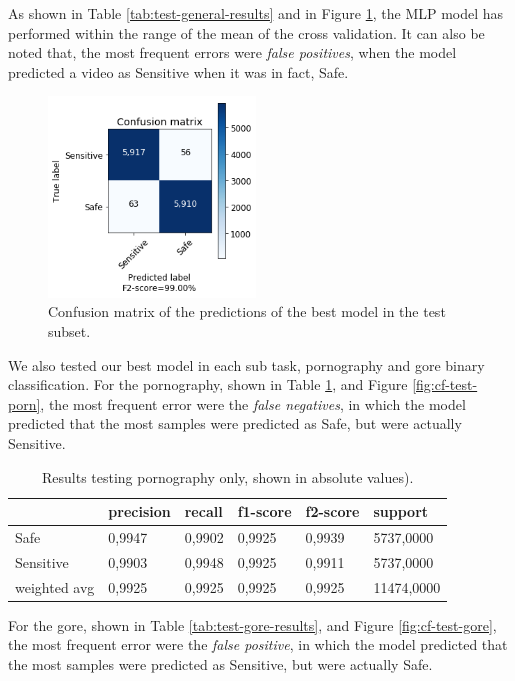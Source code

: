 As shown in Table \ref{tab:test-general-results} and in Figure \ref{fig:cf-test}, the MLP model has performed within the range of the mean of the cross validation. It can also be noted that, the most frequent errors were \textit{false positives}, when the model predicted a video as Sensitive when it was in fact, Safe. 

\begin{figure}[!ht]
    \centering
    \includegraphics[width=0.49\textwidth]{img/results/MLP-TEST.png}
    \caption{Confusion matrix of the predictions of the best model in the test subset.}
    \label{fig:cf-test}
\end{figure}

We also tested our best model in each sub task, pornography and gore binary classification. For the pornography, shown in Table \ref{tab:test-porn-results}, and Figure \ref{fig:cf-test-porn}, the most frequent error were the \textit{false negatives}, in which the model predicted that the most samples were predicted as Safe, but were actually Sensitive. 

\begin{table}[!ht]
\centering
\caption{Results testing pornography only, shown in absolute values).}
\begin{tabular}{l|l|l|l|l|l}
             & precision & recall & f1-score & f2-score & support    \\ \hline
Safe         & 0,9947    & 0,9902 & 0,9925   & 0,9939   & 5737,0000  \\ \hline
Sensitive    & 0,9903    & 0,9948 & 0,9925   & 0,9911   & 5737,0000  \\ \hline
weighted avg & 0,9925    & 0,9925 & 0,9925   & 0,9925   & 11474,0000
\end{tabular}
\label{tab:test-porn-results}
\end{table}

For the gore, shown in Table \ref{tab:test-gore-results}, and Figure \ref{fig:cf-test-gore}, the most frequent error were the \textit{false positive}, in which the model predicted that the most samples were predicted as Sensitive, but were actually Safe.  

